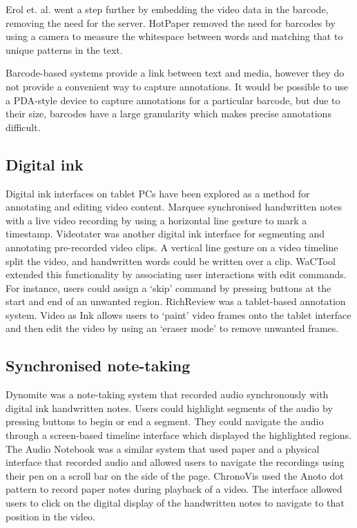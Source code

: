 Erol et.  al. \citep{Erol2007} went a step further by embedding the video data in the barcode, removing the need for
the server. HotPaper \citep{Erol2008} removed the need for barcodes by using a camera to measure the whitespace
between words and matching that to unique patterns in the text.

Barcode-based systems provide a link between text and media, however they do not provide a convenient way to capture
annotations. It would be possible to use a PDA-style device to capture annotations for a particular barcode, but
due to their size, barcodes have a large granularity which makes precise annotations difficult.

\subsection{Digital ink}
Digital ink interfaces on tablet PCs have been explored as a method for annotating and editing video content.  Marquee
\citep{Weher1994} synchronised handwritten notes with a live video recording by using a horizontal line gesture to mark
a timestamp.  Videotater \citep{Diakopoulos2006} was another digital ink interface for segmenting and annotating
pre-recorded video clips. A vertical line gesture on a video timeline split the video, and handwritten words could be
written over a clip. WaCTool \citep{Cattelan2008} extended this functionality by associating user interactions with
edit commands. For instance, users could assign a `skip' command by pressing buttons at the start and end of an
unwanted region.
RichReview \citep{Yoon2014} was a tablet-based annotation system.
Video as Ink \citep{Cabral2016} allows users to `paint' video frames onto the tablet interface and
then edit the video by using an `eraser mode' to remove unwanted frames.

\subsection{Synchronised note-taking}
Dynomite \citep{Wilcox1997} was a note-taking system that recorded audio synchronously with digital ink handwritten
notes.  Users could highlight segments of the audio by pressing buttons to begin or end a segment. They could navigate
the audio through a screen-based timeline interface which displayed the highlighted regions.  The Audio Notebook
\citep{Stifelman2001} was a similar system that used paper and a physical interface that recorded audio and allowed
users to navigate the recordings using their pen on a scroll bar on the side of the page.  ChronoVis \citep{Fouse2011}
used the Anoto dot pattern to record paper notes during playback of a video. The interface allowed users to click on
the digital display of the handwritten notes to navigate to that position in the video.

